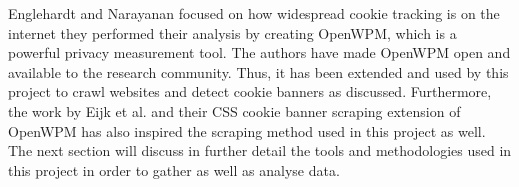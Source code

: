 \documentclass[../main.tex]{subfiles}
\begin{document}
Englehardt and Narayanan focused on how widespread cookie tracking is on the internet they performed their analysis by creating OpenWPM, which is a powerful privacy measurement tool. The authors have made OpenWPM open and available to the research community. Thus, it has been extended and used by this project to crawl websites and detect cookie banners as discussed. Furthermore, the work by Eijk et al. and their CSS cookie banner scraping extension of OpenWPM has also inspired the scraping method used in this project as well. The next section will discuss in further detail the tools and methodologies used in this project in order to gather as well as analyse data. 
\end{document}
